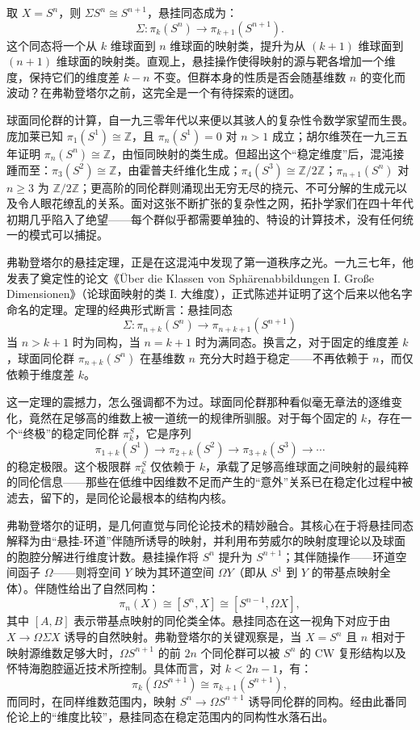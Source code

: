 \documentclass[12pt,a4paper]{article}
\begin{document}
取 $X=S^n$，则 $\Sigma S^n\cong S^{n+1}$，悬挂同态成为：
$$
\Sigma:\pi_k(S^n)\longrightarrow\pi_{k+1}(S^{n+1}).
$$
这个同态将一个从 $k$ 维球面到 $n$ 维球面的映射类，提升为从 $(k+1)$ 维球面到 $(n+1)$ 维球面的映射类。直观上，悬挂操作使得映射的源与靶各增加一个维度，保持它们的维度差 $k-n$ 不变。但群本身的性质是否会随基维数 $n$ 的变化而波动？在弗勒登塔尔之前，这完全是一个有待探索的谜团。

球面同伦群的计算，自一九三零年代以来便以其骇人的复杂性令数学家望而生畏。庞加莱已知 $\pi_1(S^1)\cong\mathbb{Z}$，且 $\pi_n(S^1)=0$ 对 $n>1$ 成立；胡尔维茨在一九三五年证明 $\pi_n(S^n)\cong\mathbb{Z}$，由恒同映射的类生成。但超出这个“稳定维度”后，混沌接踵而至：$\pi_3(S^2)\cong\mathbb{Z}$，由霍普夫纤维化生成；$\pi_4(S^3)\cong\mathbb{Z}/2\mathbb{Z}$；$\pi_{n+1}(S^n)$ 对 $n\geq 3$ 为 $\mathbb{Z}/2\mathbb{Z}$；更高阶的同伦群则涌现出无穷无尽的挠元、不可分解的生成元以及令人眼花缭乱的关系。面对这张不断扩张的复杂性之网，拓扑学家们在四十年代初期几乎陷入了绝望——每个群似乎都需要单独的、特设的计算技术，没有任何统一的模式可以捕捉。

弗勒登塔尔的悬挂定理，正是在这混沌中发现了第一道秩序之光。一九三七年，他发表了奠定性的论文《Über die Klassen von Sphärenabbildungen I. Große Dimensionen》（论球面映射的类 I. 大维度），正式陈述并证明了这个后来以他名字命名的定理。定理的经典形式断言：悬挂同态
$$
\Sigma:\pi_{n+k}(S^n)\longrightarrow\pi_{n+k+1}(S^{n+1})
$$
当 $n>k+1$ 时为同构，当 $n=k+1$ 时为满同态。换言之，对于固定的维度差 $k$，球面同伦群 $\pi_{n+k}(S^n)$ 在基维数 $n$ 充分大时趋于稳定——不再依赖于 $n$，而仅依赖于维度差 $k$。

这一定理的震撼力，怎么强调都不为过。球面同伦群那种看似毫无章法的逐维变化，竟然在足够高的维数上被一道统一的规律所驯服。对于每个固定的 $k$，存在一个“终极”的稳定同伦群 $\pi_k^S$，它是序列
$$
\pi_{1+k}(S^1)\longrightarrow\pi_{2+k}(S^2)\longrightarrow\pi_{3+k}(S^3)\longrightarrow\cdots
$$
的稳定极限。这个极限群 $\pi_k^S$ 仅依赖于 $k$，承载了足够高维球面之间映射的最纯粹的同伦信息——那些在低维中因维数不足而产生的“意外”关系已在稳定化过程中被滤去，留下的，是同伦论最根本的结构内核。

弗勒登塔尔的证明，是几何直觉与同伦论技术的精妙融合。其核心在于将悬挂同态解释为由“悬挂-环道”伴随所诱导的映射，并利用布劳威尔的映射度理论以及球面的胞腔分解进行维度计数。悬挂操作将 $S^n$ 提升为 $S^{n+1}$；其伴随操作——环道空间函子 $\Omega$——则将空间 $Y$ 映为其环道空间 $\Omega Y$（即从 $S^1$ 到 $Y$ 的带基点映射全体）。伴随性给出了自然同构：
$$
\pi_n(X)\cong[S^n,X]\cong[S^{n-1},\Omega X],
$$
其中 $[A,B]$ 表示带基点映射的同伦类全体。悬挂同态在这一视角下对应于由 $X\to\Omega\Sigma X$ 诱导的自然映射。弗勒登塔尔的关键观察是，当 $X=S^n$ 且 $n$ 相对于映射源维数足够大时，$\Omega S^{n+1}$ 的前 $2n$ 个同伦群可以被 $S^n$ 的 CW 复形结构以及怀特海胞腔逼近技术所控制。具体而言，对 $k<2n-1$，有：
$$
\pi_k(\Omega S^{n+1})\cong\pi_{k+1}(S^{n+1}),
$$
而同时，在同样维数范围内，映射 $S^n\to\Omega S^{n+1}$ 诱导同伦群的同构。经由此番同伦论上的“维度比较”，悬挂同态在稳定范围内的同构性水落石出。
\end{document}
